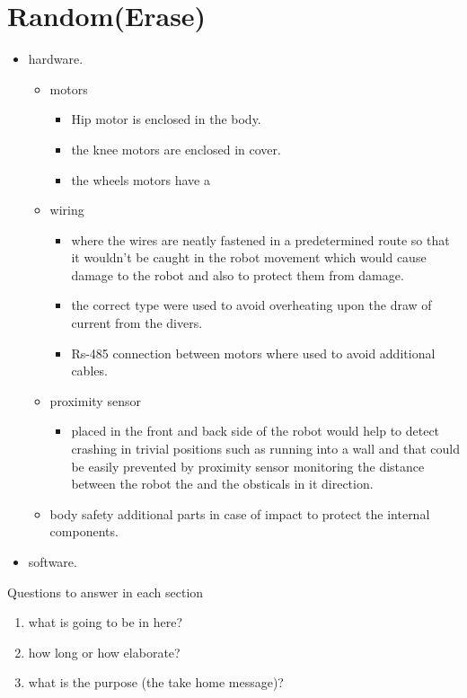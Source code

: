 \chapter{Random(Erase)}

\graphicspath{{./Figures/Design}}


\begin{itemize}
	\item hardware.
	\begin{itemize}
		\item motors
			\begin{itemize}
				\item Hip motor is enclosed in the body.
				\item the knee motors are enclosed in cover.
				\item the wheels motors have a
			\end{itemize}
		\item wiring
		\begin{itemize}
			\item where the wires are neatly fastened in a predetermined route so that it wouldn't be caught in the robot movement which would cause damage to the robot and also to protect them from damage.
			\item the correct type were used to avoid overheating upon the draw of current from the divers.
			\item Rs-485 connection between motors where used to avoid additional cables.
		\end{itemize}

		\item proximity sensor
		\begin{itemize}
			\item  placed in the front and back side of the robot would help to detect crashing in trivial positions such as running into a wall and that could be easily prevented by proximity sensor monitoring the distance between the robot the and the obsticals in it direction.
		\end{itemize}

		\item body safety additional parts in case of impact to protect the internal components.
	\end{itemize}
	\item software.

\end{itemize}


Questions to answer in each section


\begin{enumerate}
	\item what is going to be in here?
	\item how long or how elaborate?
	\item what is the purpose (the take home message)?
\end{enumerate}





